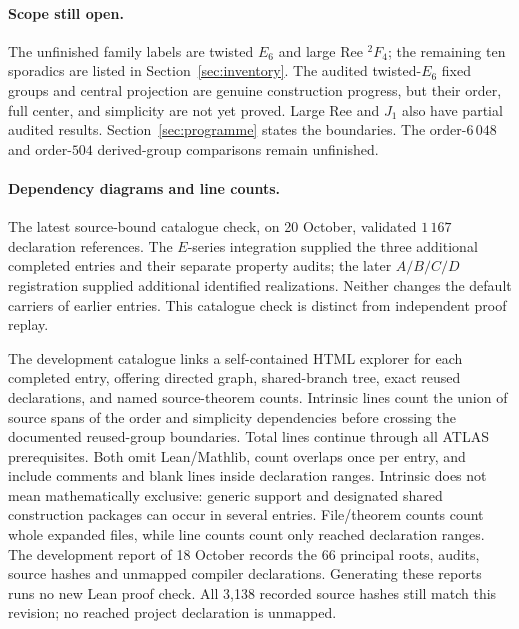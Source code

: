 \documentclass[11pt]{article}
\numberwithin{equation}{section}
\theoremstyle{definition}
\begin{document}
\paragraph{Scope still open.}
The unfinished family labels are twisted $E_6$ and large Ree ${}^2F_4$;
the remaining ten sporadics are listed in Section~\ref{sec:inventory}.
The audited twisted-$E_6$ fixed groups and central projection are genuine
construction progress, but their order, full center, and simplicity are
not yet proved. Large Ree and $J_1$ also have partial audited results.
Section~\ref{sec:programme} states the boundaries. The order-$6\,048$
and order-$504$ derived-group comparisons remain unfinished.


\paragraph{Dependency diagrams and line counts.}
The latest source-bound catalogue check, on 20 October, validated
$1\,167$ declaration references. The $E$-series integration supplied the
three additional completed entries and their separate property audits;
the later $A/B/C/D$ registration supplied additional identified
realizations. Neither changes the default carriers of earlier entries.
This catalogue check is distinct from independent proof replay.


The development catalogue links a self-contained HTML explorer for each completed
entry, offering directed graph, shared-branch tree, exact reused declarations,
and named source-theorem counts. Intrinsic lines count the union of source spans
of the order and simplicity dependencies before crossing the documented reused-group
boundaries. Total lines continue through all ATLAS prerequisites. Both omit
Lean/Mathlib, count overlaps once per entry, and include comments and blank lines
inside declaration ranges. Intrinsic does not mean mathematically exclusive:
generic support and designated shared construction packages can occur in several
entries. File/theorem counts count whole expanded files, while line counts count
only reached declaration ranges. The development report of 18 October records the 66 principal roots,
audits, source hashes and unmapped compiler declarations. Generating these reports
runs no new Lean proof check. All 3,138 recorded source hashes still match this revision; no reached project declaration is unmapped.
\end{document}
